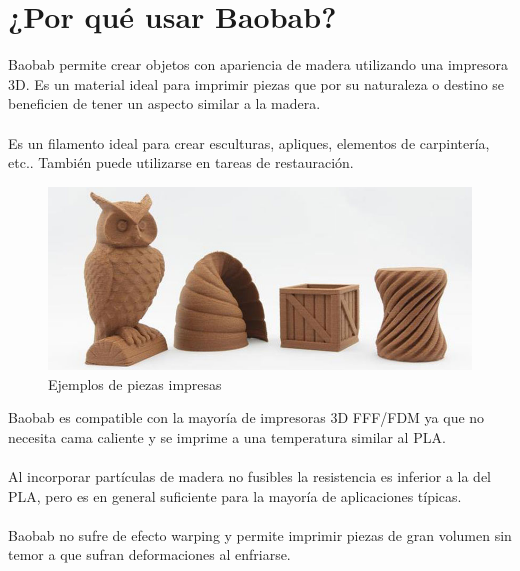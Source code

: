 \documentclass[11pt,a4paper]{article}
\begin{document}
\section{¿Por qué usar Baobab?}
Baobab permite crear objetos con apariencia de madera utilizando una impresora 3D. Es un material ideal para imprimir piezas que por su naturaleza o destino se beneficien de tener un aspecto similar a la madera.\\\\
Es un filamento ideal para crear esculturas, apliques, elementos de carpintería, etc.. También puede utilizarse en tareas de restauración.\begin{figure}[H]
\centering
\includegraphics[width=1\textwidth,cfbox=azul_marcos 4pt 0pt]{FOTOS/SAMPLE_PARTS}
	\caption*{Ejemplos de piezas impresas}
\end{figure}
Baobab es compatible con la mayoría de impresoras 3D FFF/FDM ya que no necesita cama caliente y se imprime a una temperatura similar al PLA.\\\\
Al incorporar partículas de madera no fusibles la resistencia es inferior a la del PLA, pero es en general suficiente para la mayoría de aplicaciones típicas.\\\\
Baobab no sufre de efecto warping y permite imprimir piezas de gran volumen sin temor a que sufran deformaciones al enfriarse.
\end{document}
